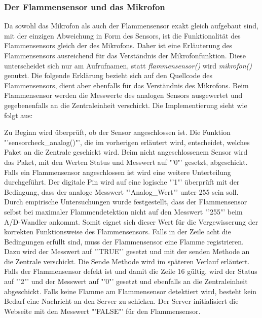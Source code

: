 \subsubsection*{Der Flammensensor und das Mikrofon}
	Da sowohl das Mikrofon als auch der Flammensensor exakt gleich aufgebaut sind, mit der einzigen Abweichung in Form des Sensors, ist die Funktionalität des Flammensensors gleich der des Mikrofons. Daher ist eine Erläuterung des Flammensensors ausreichend für das Verständnis der Mikrofonfunktion. Diese unterscheidet sich nur am Aufrufnamen, statt \textit{flammensensor()} wird \textit{mikrofon()} genutzt. Die folgende Erklärung bezieht sich auf den Quellcode des Flammensensors, dient aber ebenfalls für das Verständnis des Mikrofons. Beim Flammensensor werden die Messwerte des analogen Sensors ausgewertet und gegebenenfalls an die Zentraleinheit verschickt. Die Implementierung sieht wie folgt aus:
	
	Zu Beginn wird überprüft, ob der Sensor angeschlossen ist. Die Funktion "'sensorcheck\_analog()"', die im vorherigen  erläutert wird, entscheidet, welches Paket an die Zentrale geschickt wird. Beim nicht angeschlossenem Sensor wird das Paket, mit den Werten Status und Messwert auf "'0"' gesetzt, abgeschickt. Falls ein Flammensensor angeschlossen ist wird eine weitere Unterteilung durchgeführt. Der digitale Pin wird auf eine logische "'1"' überprüft mit der Bedingung, dass der analoge Messwert "'Analog\_Wert"' unter 255 sein soll. Durch empirische Untersuchungen wurde festgestellt, dass der Flammensensor selbst bei maximaler Flammendetektion nicht auf den Messwert "'255"' beim A/D-Wandler ankommt. Somit eignet sich dieser Wert für die Vergewisserung der korrekten Funktionsweise des Flammensensors. Falls in der Zeile acht die Bedingungen erfüllt sind, muss der Flammensensor eine Flamme registrieren. Dazu wird der Messwert auf "'TRUE"' gesetzt und mit der senden Methode an die Zentrale verschickt. Die Sende Methode wird im späteren Verlauf erläutert. Falls der Flammensensor defekt ist und damit die Zeile 16 gültig, wird der Status auf "'2"' und der Messwert auf "'0"' gesetzt und ebenfalls an die Zentraleinheit abgeschickt. Falls keine Flamme am Flammensensor detektiert wird, besteht kein Bedarf eine Nachricht an den Server zu schicken. Der Server initialisiert die Webseite mit den Messwert "'FALSE"' für den Flammensensor.
